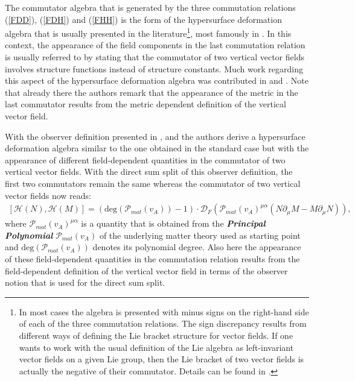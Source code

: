 The commutator algebra that is generated by the three commutation relations (\ref{FDD}), (\ref{FDH}) and (\ref{FHH}) is the form of the hypersurface deformation algebra that is usually presented in the literature\footnote{In most cases the algebra is presented with minus signs on the right-hand side of each of the three commutation relations. The sign discrepancy results from different ways of defining the Lie bracket structure for vector fields. If one wants to work with the usual definition of the Lie algebra as left-invariant vector fields on a given Lie group, then the Lie bracket of two vector fields is actually the negative of their commutator. Details can be found in \cite{1985AnPhy.164..288I}.}, most famously in \cite{HOJMAN197688}. In this context, the appearance of the field components in the last commutation relation is usually referred to by stating that the commutator of two vertical vector fields involves structure functions instead of structure constants. Much work regarding this aspect of the hypersurface deformation algebra was contributed in \cite{1985AnPhy.164..288I} and \cite{1985AnPhy.164..316I}. Note that already there the authors remark that the appearance of the metric in the last commutator results from the metric dependent definition of the vertical vector field. 

With the observer definition presented in \cite{2018PhRvD..97h4036D}, \cite{2011PhRvD..83d4047R} and \cite{Rivera} the authors derive a hypersurface deformation algebra similar to the one obtained in the standard case but with the appearance of different field-dependent quantities in the commutator of two vertical vector fields. With the direct sum split of this observer definition, the first two commutators remain the same whereas the commutator of two vertical vector fields now reads:
\begin{align}\label{PolyAlg}
    \left[\mathcal{H}(N), \mathcal{H}(M) \right] = \left(\mathrm{deg}(\mathcal{P}_{mat}(v_A)) -1\right ) \cdot  \mathcal{D}_F\left(\mathcal{P}_{mat}(v_A)^{\mu \alpha}( N\partial_{\mu} M - M \partial_{\mu}N  ) \right),
\end{align}
where $\mathcal{P}_{mat}(v_A)^{\mu \alpha}$ is a quantity that is obtained from the \textit{\textbf{Principal Polynomial}} $\mathcal{P}_{mat}(v_A)$ of the underlying matter theory used as starting point and $\mathrm{deg}(\mathcal{P}_{mat}(v_A))$ denotes its polynomial degree. Also here the appearance of these field-dependent quantities in the commutation relation results from the field-dependent definition of the vertical vector field in terms of the observer notion that is used for the direct sum split.
